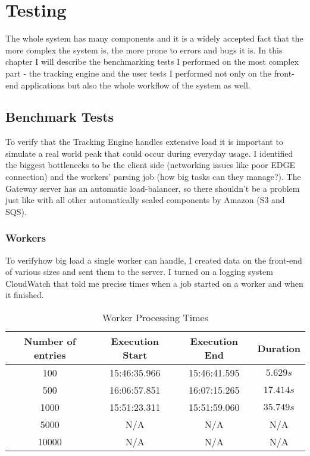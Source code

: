 \chapter{Testing}

The whole system has many components and it is a widely accepted fact that the more complex the system is, the more prone to errors and bugs it is. In this chapter I will describe the benchmarking tests I performed on the most complex part - the tracking engine and the user tests I performed not only on the front-end applications but also the whole workflow of the system as well.

\section{Benchmark Tests}

To verify that the Tracking Engine handles extensive load it is important to simulate a real world peak that could occur during everyday usage. I identified the biggest bottlenecks to be the client side (networking issues like poor EDGE connection) and the workers' parsing job (how big tasks can they manage?). The Gateway server has an automatic load-balancer, so there shouldn't be a problem just like with all other automatically scaled components by Amazon (S3 and SQS).

\subsection{Workers}

To verifyhow big load a single worker can handle, I created data on the front-end of various sizes and sent them to the server. I turned on a logging system CloudWatch that told me precise times when a job started on a worker and when it finished.

\begin{table}[!ht]
\begin{center}
\begin{tabular}{|c|c|c|c|}
\hline
\textbf{Number of entries} & \textbf{Execution Start} & \textbf{Execution End} & \textbf{Duration} \\
\hline
100 & 15:46:35.966 & 15:46:41.595 & $5.629s$ \\
\hline
500 & 16:06:57.851 & 16:07:15.265 & $17.414s$ \\
\hline
1000 & 15:51:23.311 & 15:51:59.060 & $35.749s$ \\
\hline
5000 & N/A & N/A & N/A \\
\hline
10000 & N/A & N/A & N/A \\
\hline
\end{tabular}
\end{center}
\caption{Worker Processing Times}
\label{tab:ex_db}
\end{table}

